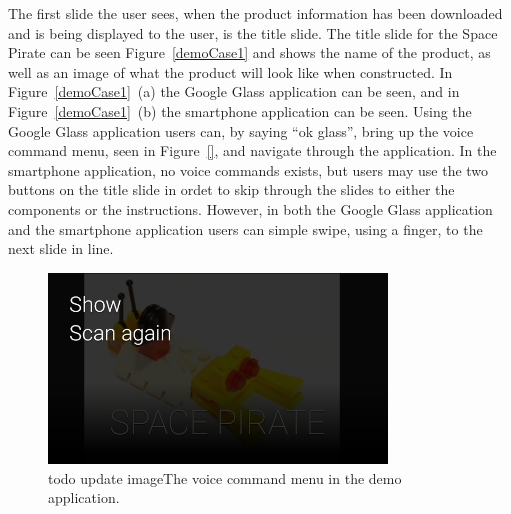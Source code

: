 The first slide the user sees, when the product information has been downloaded and is being displayed to the user, is the title slide. The title slide for the Space Pirate can be seen Figure~\ref{demoCase1} and shows the name of the product, as well as an image of what the product will look like when constructed. In Figure~\ref{demoCase1}~(a) the Google Glass application can be seen, and in Figure~\ref{demoCase1}~(b) the smartphone application can be seen. Using the Google Glass application users can, by saying ``ok glass'', bring up the voice command menu, seen in Figure~\ref{}, and navigate through the application. In the smartphone application, no voice commands exists, but users may use the two buttons on the title slide in ordet to skip through the slides to either the components or the instructions. However, in both the Google Glass application and the smartphone application users can simple swipe, using a finger, to the next slide in line. 

	\begin{figure}[ht!]
		\centering
		\includegraphics[width=90mm]{images/demo/voiceCommand1}
		\caption{todo update imageThe voice command menu in the demo application.}
		\label{glassDemoVoiceCommand}
	\end{figure}

